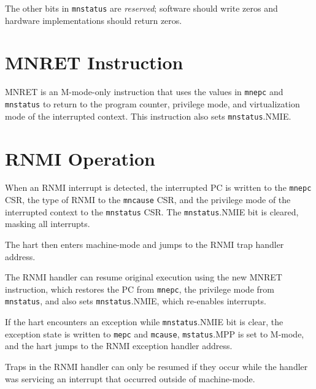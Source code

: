 The other
bits in {\tt mnstatus} are {\em reserved}; software should write zeros and
hardware implementations should return zeros.

\section{MNRET Instruction}

MNRET is an M-mode-only instruction that uses the values in {\tt mnepc} and
{\tt mnstatus} to return to the program counter, privilege mode,
and virtualization mode of the interrupted context.
This instruction also sets {\tt mnstatus}.NMIE.

\section{RNMI Operation}

When an RNMI interrupt is detected, the interrupted PC is written to
the {\tt mnepc} CSR, the type of RNMI to the {\tt mncause} CSR, and the
privilege mode of the interrupted context to the {\tt mnstatus} CSR.
The {\tt mnstatus}.NMIE bit is cleared, masking all interrupts.

The hart then enters machine-mode and jumps to the RNMI trap handler
address.

The RNMI handler can resume original execution using the new MNRET
instruction, which restores the PC from {\tt mnepc}, the privilege mode
from {\tt mnstatus}, and also sets {\tt mnstatus}.NMIE, which
re-enables interrupts.

If the hart encounters an exception while {\tt mnstatus}.NMIE bit is clear, the
exception state is written to {\tt mepc} and {\tt mcause}, {\tt mstatus}.MPP is
set to M-mode, and the hart jumps to the RNMI exception handler
address.

\begin{commentary}
Traps in the RNMI handler can only be resumed if they occur while
the handler was servicing an interrupt that occurred outside of
machine-mode.
\end{commentary}
